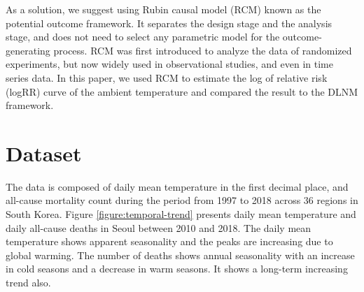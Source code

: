 \documentclass[12pt]{article}
\begin{document}
As a solution, we suggest using Rubin causal model (RCM)\cite{holland1986}
known as the potential outcome framework.
It separates the design stage and the analysis stage,
and does not need to select any parametric model for the outcome-generating process.
RCM was first introduced 
to analyze the data of randomized experiments\cite{rubin1974},
but now widely used in observational studies\cite{wu2020sciadv},
and even in time series data\cite{angrist2018}.
In this paper, 
we used RCM to estimate the log of relative risk (logRR) curve of the ambient temperature 
and compared the result to the DLNM framework.

\section{Dataset}
\label{section:data}

The data is composed of daily mean temperature in the first decimal place, and
all-cause mortality count during the period from 1997 to 2018 across 36 regions in South Korea.
Figure \ref{figure:temporal-trend}
presents daily mean temperature and daily all-cause deaths in Seoul between 2010 and 2018.
The daily mean temperature shows apparent seasonality and 
the peaks are increasing due to global warming.
The number of deaths shows annual seasonality 
with an increase in cold seasons and a decrease in warm seasons.
It shows a long-term increasing trend also.
\end{document}

